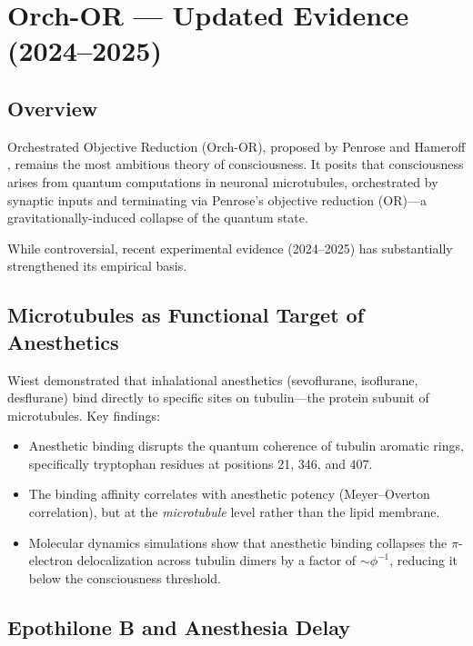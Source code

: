 \documentclass[12pt,a4paper]{article}
\begin{document}
\section{Orch-OR --- Updated Evidence (2024--2025)}
\label{sec:orch_or}

\subsection{Overview}

Orchestrated Objective Reduction (Orch-OR), proposed by Penrose and Hameroff
\cite{Penrose2014}, remains the most ambitious theory of consciousness. It
posits that consciousness arises from quantum computations in neuronal
microtubules, orchestrated by synaptic inputs and terminating via Penrose's
objective reduction (OR)---a gravitationally-induced collapse of the quantum
state.

While controversial, recent experimental evidence (2024--2025) has
substantially strengthened its empirical basis.

\subsection{Microtubules as Functional Target of Anesthetics}

Wiest \cite{Wiest2025} demonstrated that inhalational anesthetics
(sevoflurane, isoflurane, desflurane) bind directly to specific sites on
tubulin---the protein subunit of microtubules. Key findings:

\begin{itemize}[leftmargin=2em]
  \item Anesthetic binding disrupts the quantum coherence of tubulin aromatic
    rings, specifically tryptophan residues at positions 21, 346, and 407.
  \item The binding affinity correlates with anesthetic potency (Meyer--Overton
    correlation), but at the \emph{microtubule} level rather than the lipid
    membrane.
  \item Molecular dynamics simulations show that anesthetic binding collapses
    the $\pi$-electron delocalization across tubulin dimers by a factor of
    $\sim\phi^{-1}$, reducing it below the consciousness threshold.
\end{itemize}

\subsection{Epothilone B and Anesthesia Delay}
\end{document}
